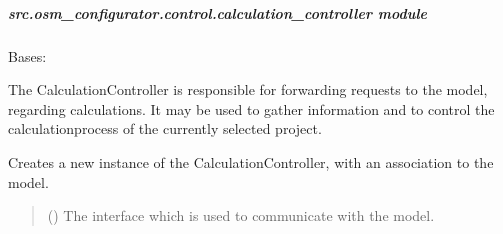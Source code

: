 \documentclass[letterpaper,10pt,english]{sphinxmanual}
\begin{document}
\subparagraph{src.osm\_configurator.control.calculation\_controller module}
\label{\detokenize{apidoc/src.osm_configurator.control:module-src.osm_configurator.control.calculation_controller}}\label{\detokenize{apidoc/src.osm_configurator.control:src-osm-configurator-control-calculation-controller-module}}

\begin{fulllineitems}
\label{\detokenize{apidoc/src.osm_configurator.control:src.osm_configurator.control.calculation_controller.CalculationController}}
\pysigstartsignatures
{}
\pysigstopsignatures
\sphinxAtStartPar
Bases: 

\sphinxAtStartPar
The CalculationController is responsible for forwarding requests to the model, regarding calculations.
It may be used to gather information and to control the calculation\sphinxhyphen{}process of the currently selected project.

\begin{fulllineitems}
\label{\detokenize{apidoc/src.osm_configurator.control:src.osm_configurator.control.calculation_controller.CalculationController.__init__}}
\pysigstartsignatures
{}
\pysigstopsignatures
\sphinxAtStartPar
Creates a new instance of the CalculationController, with an association to the model.
\begin{quote}\begin{description}
\sphinxAtStartPar
{} ({\hyperref[\detokenize{apidoc/src.osm_configurator.model.application:src.osm_configurator.model.application.application_interface.IApplication}]{}}) \textendash{} The interface which is used to communicate with the model.


\end{description}
\end{quote}
\end{fulllineitems}
\end{fulllineitems}
\end{document}
